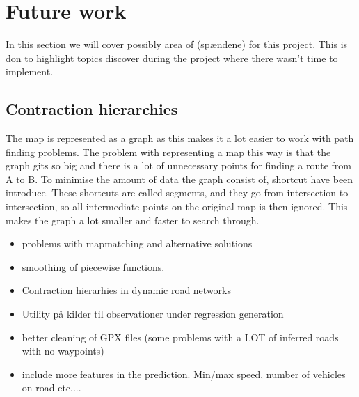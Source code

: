 \section{Future work}\label{sec:future}
In this section we will cover possibly area of (spændene) for this project. This is don to highlight topics discover during the project where there wasn't time to implement.
\subsection{Contraction hierarchies}\label{contraction-hierarchies}
The map is represented as a graph as this makes it a lot easier to work with path finding problems. The problem with representing a map this way is that the graph gits so big and there is a lot of unnecessary points for finding a route from A to B. To minimise the amount of data the graph consist of, shortcut have been introduce. These shortcuts are called segments, and they go from intersection to intersection, so all intermediate points on the original map is then ignored. This makes the graph a lot smaller and faster to search through.

\begin{itemize}
	\item problems with mapmatching and alternative solutions
	\item smoothing of piecewise functions.
	\item Contraction hierarhies in dynamic road networks
	\item Utility på kilder til observationer under regression generation
	\item better cleaning of GPX files (some problems with a LOT of inferred roads with no waypoints)
	\item include more features in the prediction. Min/max speed, number of vehicles on road etc....
\end{itemize}
